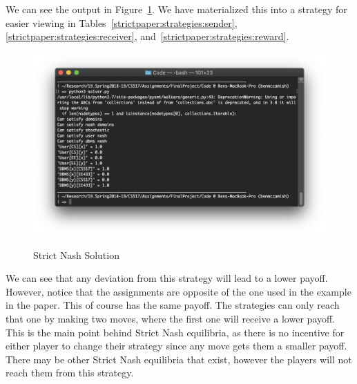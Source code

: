 \documentclass{article}
\begin{document}
We can see the output in Figure~\ref{fig:strictpaper}. We have materialized this into a strategy for easier viewing in Tables~\ref{strictpaper:strategies:sender},\ref{strictpaper:strategies:receiver}, and~\ref{strictpaper:strategies:reward}. 
\begin{figure}[h!]
\centering
\includegraphics[width=20cm]{images/strictPaper}
\label{fig:strictpaper}
\caption{Strict Nash Solution}
\end{figure}

We can see that any deviation from this strategy will lead to a lower payoff. However, notice that the assignments are opposite of the one used in the example in the paper. This of course has the same payoff. The strategies can only reach that one by making two moves, where the first one will receive a lower payoff. This is the main point behind Strict Nash equilibria, as there is no incentive for either player to change their strategy since any move gets them a smaller payoff. There may be other Strict Nash equilibria that exist, however the players will not reach them from this strategy.
\end{document}
